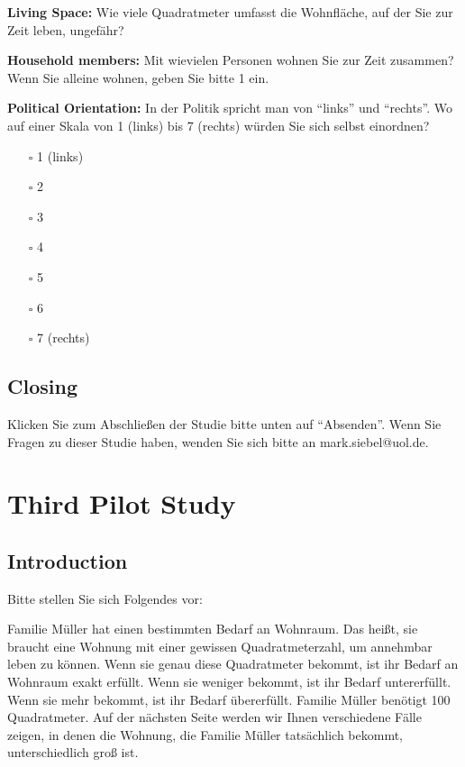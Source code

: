 \documentclass[egregdoesnotlikesansseriftitles]{scrartcl}
\begin{document}
\vspace{1em}
\noindent\textbf{Living Space:} Wie viele Quadratmeter umfasst die Wohnfläche, auf der Sie zur Zeit leben, ungefähr?

\vspace{1em}
\noindent\textbf{Household members:} Mit wievielen Personen wohnen Sie zur Zeit zusammen? Wenn Sie alleine wohnen, geben Sie bitte 1 ein.

\vspace{1em}
\noindent\textbf{Political Orientation:} In der Politik spricht man von \enquote{links} und \enquote{rechts}. Wo auf einer Skala von 1 (links) bis 7 (rechts) würden Sie sich selbst einordnen?
\begin{itemize}
   \item[$\square$] 1 (links)
   \item[$\square$] 2
   \item[$\square$] 3
   \item[$\square$] 4
   \item[$\square$] 5
   \item[$\square$] 6
   \item[$\square$] 7 (rechts)
\end{itemize}


\subsection*{Closing}
Klicken Sie zum Abschließen der Studie bitte unten auf \enquote{Absenden}. Wenn Sie Fragen zu dieser Studie haben, wenden Sie sich bitte an mark.siebel@uol.de.


\section{Third Pilot Study}\label{sec:app_pilot_3}
\subsection*{Introduction}
Bitte stellen Sie sich Folgendes vor:

Familie Müller hat einen bestimmten Bedarf an Wohnraum.
Das heißt, sie braucht eine Wohnung mit einer gewissen Quadratmeterzahl, um annehmbar leben zu können.
Wenn sie genau diese Quadratmeter bekommt, ist ihr Bedarf an Wohnraum exakt erfüllt.
Wenn sie weniger bekommt, ist ihr Bedarf untererfüllt.
Wenn sie mehr bekommt, ist ihr Bedarf übererfüllt.
Familie Müller benötigt 100 Quadratmeter.
Auf der nächsten Seite werden wir Ihnen verschiedene Fälle zeigen, in denen die Wohnung, die Familie Müller tatsächlich bekommt, unterschiedlich groß ist.
\end{document}
